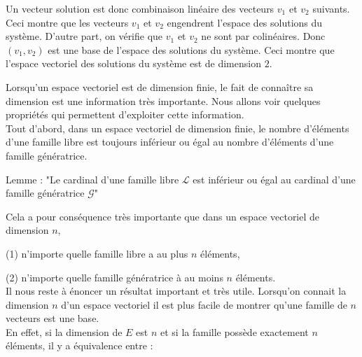 \change

\change

Un vecteur solution est donc combinaison linéaire des vecteurs  $v_1$ et $v_2$ suivants. 
Ceci montre que les vecteurs $v_1$ et $v_2$
 engendrent l'espace des solutions du système.  
D'autre part, on vérifie que $v_1$ et $v_2$ ne sont par colinéaires. 
Donc $(v_1, v_2)$ est une base de l'espace des solutions du système. 
Ceci montre que l'espace vectoriel des solutions du système est de dimension $2$.  


\diapo
Lorsqu'un espace vectoriel est de dimension finie, 
le fait de connaître sa dimension est une information très importante. Nous allons voir quelques propriétés 
qui permettent d'exploiter cette information.\\

Tout d'abord, dans un espace vectoriel de dimension finie, 
le nombre d'éléments d'une famille libre est toujours 
inférieur ou égal au nombre d'éléments d'une famille génératrice.

Lemme : "Le cardinal d'une famille libre $\mathcal{L}$ 
est inférieur ou égal au cardinal d'une famille génératrice $\mathcal{G}$"


\change
Cela a pour conséquence très importante 
que dans un espace vectoriel de dimension $n$, 

\change
(1) n'importe quelle famille libre a au plus $n$ éléments, 

\change
(2) n'importe quelle famille génératrice à au moins $n$ éléments. \\

% 
% 

\diapo
Il nous reste à énoncer un résultat important et très utile. Lorsqu'on connait la dimension $n$ d'un espace vectoriel il est plus facile de montrer qu'une famille de $n$ vecteurs est une base. \\

En effet, si la dimension de $E$ est $n$ et si la famille possède exactement $n$ éléments, il y a équivalence entre :\\

